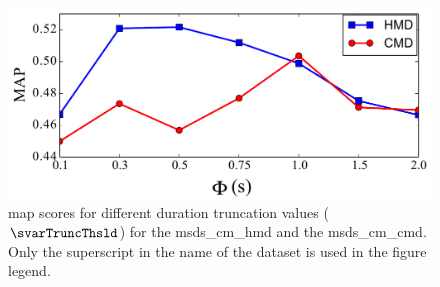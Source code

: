 \begin{figure}[h]
	\begin{center}
		\includegraphics[width=\figSizeEightyFive]{ch06_patterns/figures/ImprovingSimilarity/MAP_per_Duration_Truncation.pdf}
	\end{center}
	\caption[\acrshort{map} score for different duration truncation values]{\gls{map} scores for different duration truncation values ($\svarTruncThsld$) for the \acrshort{msds_cm_hmd} and the \acrshort{msds_cm_cmd}. Only the superscript in the name of the dataset is used in the figure legend.} 
	\label{fig:map_per_duration_truncation}
\end{figure}

